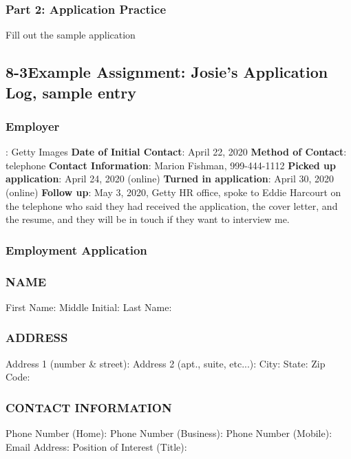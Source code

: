 \subsubsection*{Part 2: Application Practice}
Fill out the sample application

\pagebreak \subsection*{8-3\quad Example Assignment: Josie's Application Log, sample entry}
\subsubsection*{Employer}: Getty Images
\break \textbf{Date of Initial Contact}: April 22, 2020
\break \textbf{Method of Contact}: telephone
\break \textbf{Contact Information}: Marion Fishman, 999-444-1112
\break \textbf{Picked up application}: April 24, 2020 (online)
\break \textbf{Turned in application}: April 30, 2020 (online)
\break \textbf{Follow up}: May 3, 2020, Getty HR office, spoke to Eddie Harcourt on the telephone who said they had received the application, the cover letter, and the resume, and they will be in touch if they want to interview me.

\subsubsection*{Employment Application}

\subsubsection*{NAME}
\break First Name:
\break Middle Initial:
\break Last Name:

\subsubsection*{ADDRESS}
\break Address 1 (number \& street):
\break Address 2 (apt., suite, etc...):
\break City:
\break State:
\break Zip Code:

\subsubsection*{CONTACT INFORMATION}
\break Phone Number (Home):
\break Phone Number (Business):
\break Phone Number (Mobile):
\break Email Address:
\break Position of Interest (Title):

